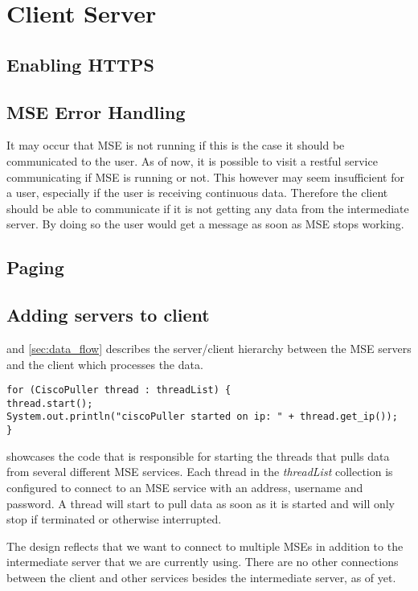 \section{Client Server}

\subsection*{Enabling HTTPS}

\subsection*{MSE Error Handling}
It may occur that MSE is not running if this is the case it should be communicated to the user. As of now, it is possible to visit a restful service communicating if MSE is running or not. This however may seem insufficient for a user, especially if the user is receiving continuous data. Therefore the client should be able to communicate if it is not getting any data from the intermediate server. By doing so the user would get a message as soon as MSE stops working.


\subsection*{Paging}

\subsection*{Adding servers to client}
 and \cref{sec:data_flow} describes the server/client hierarchy between the MSE servers and the client which processes the data. 
\begin{lstlisting}[caption={Starting multiple threads to pull data from multiple MSE servers}, label={lst:cisco_puller}, language=inc_Java]
for (CiscoPuller thread : threadList) {
thread.start();
System.out.println("ciscoPuller started on ip: " + thread.get_ip());
}
\end{lstlisting}
 showcases the code that is responsible for starting the threads that pulls data from several different MSE services. Each thread in the \textit{threadList} collection is configured to connect to an MSE service with an address, username and password. A thread will start to pull data as soon as it is started and will only stop if terminated or otherwise interrupted.

The design reflects that we want to connect to multiple MSEs in addition to the intermediate server that we are currently using. There are no other connections between the client and other services besides the intermediate server, as of yet.